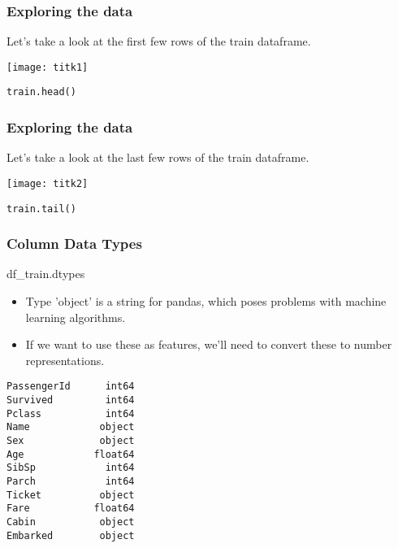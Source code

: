 \begin{frame}[fragile]\frametitle{Exploring  the data}
Let's take a look at the first few rows of the train dataframe.

\begin{center}
\texttt{[image: titk1]}
\end{center}

\begin{lstlisting}
train.head()
\end{lstlisting}

\end{frame}

\begin{frame}[fragile]\frametitle{Exploring  the data}
Let's take a look at the last few rows of the train dataframe.

\begin{center}
\texttt{[image: titk2]}
\end{center}

\begin{lstlisting}
train.tail()
\end{lstlisting}
\end{frame}

\begin{frame}[fragile]\frametitle{Column Data Types}
df\_train.dtypes

\begin{itemize}
\item Type 'object' is a string for pandas, which poses problems with machine learning algorithms. 
\item If we want to use these as features, we'll need to convert these to number representations.
\end{itemize}

\begin{lstlisting}
PassengerId      int64
Survived         int64
Pclass           int64
Name            object
Sex             object
Age            float64
SibSp            int64
Parch            int64
Ticket          object
Fare           float64
Cabin           object
Embarked        object
\end{lstlisting}

\end{frame}

